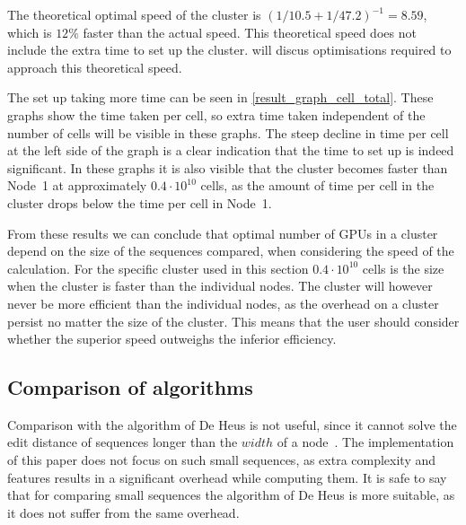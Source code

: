 The theoretical optimal speed of the cluster is $(1/10.5 + 1/47.2)^{-1} = 8.59$, which is $12\%$ faster than the actual speed.
This theoretical speed does not include the extra time to set up the cluster.
 will discus optimisations required to approach this theoretical speed.

The set up taking more time can be seen in \cref{result_graph_cell_total}.
These graphs show the time taken per cell, so extra time taken independent of the number of cells will be visible in these graphs.
The steep decline in time per cell at the left side of the graph is a clear indication that the time to set up is indeed significant.
In these graphs it is also visible that the cluster becomes faster than Node~1 at approximately $0.4 \cdot 10^{10}$ cells, as the amount of time per cell in the cluster drops below the time per cell in Node~1.

From these results we can conclude that optimal number of GPUs in a cluster depend on the size of the sequences compared, when considering the speed of the calculation.
For the specific cluster used in this section $0.4 \cdot 10^{10}$ cells is the size when the cluster is faster than the individual nodes.
The cluster will however never be more efficient than the individual nodes, as the overhead on a cluster persist no matter the size of the cluster.
This means that the user should consider whether the superior speed outweighs the inferior efficiency.

\subsection{Comparison of algorithms} \label{compare}
Comparison with the algorithm of De Heus is not useful, since it cannot solve the edit distance of sequences longer than the $width$ of a node~\cite{Heus}.
The implementation of this paper does not focus on such small sequences, as extra complexity and features results in a significant overhead while computing them.
It is safe to say that for comparing small sequences the algorithm of De Heus is more suitable, as it does not suffer from the same overhead.


\begin{comment}
\subsection{Comparison with CPU implementations}
Comparing the implementation with CPU based algorithms is also not useful, as there is no reliable method to compare the performance of CPUs with GPUs apart from running the implementation on each of them.
The difference between CPUs and GPUs is significantly

A more expensive device will not necessarily have a better performance, so even the cost does not serve as a reliable benchmark.

Even the cost of the devices is not a reliable benchmark as manufacturers do not publish the production cost of a device and use different profit margins.
That is why no such comparison is included.
\end{comment}
